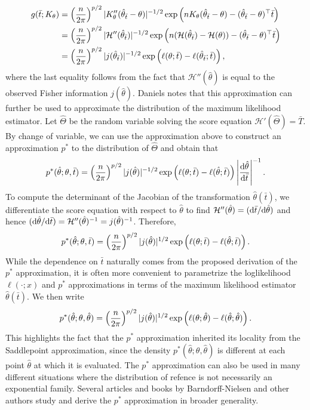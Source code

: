 \begin{align*}
    g(\bar t; K_\theta) 
    &= \left(\frac{n}{2\pi}\right)^{p/2}|K_\theta''(\hat\theta_{\bar t} - \theta)|^{-1/2} \exp\left(nK_\theta(\hat\theta_{\bar t} - \theta) - (\hat\theta_{\bar t} - \theta)^\top \bar t\right)\\
    &= \left(\frac{n}{2\pi}\right)^{p/2}|\mathcal{H}''(\hat\theta_{\bar t})|^{-1/2} \exp\left(n(\mathcal{H}(\hat\theta_{\bar t}) - \mathcal{H}(\theta)) - (\hat\theta_{\bar t} - \theta)^\top \bar t\right)\\
    &= \left(\frac{n}{2\pi}\right)^{p/2}|j(\hat\theta_{\bar t})|^{-1/2} \exp\left(\ell(\theta; \bar t) - \ell(\hat\theta_{\bar t}; \bar t)\right),
\end{align*}
where the last equality follows from the fact that $\mathcal{H}''(\hat\theta)$ is equal to the observed Fisher information $j(\hat\theta)$. Daniels \cite{daniels1958} notes that this approximation can further be used to approximate the distribution of the maximum likelihood estimator. Let $\hat\Theta$ be the random variable solving the score equation $\mathcal{H}'(\hat\Theta) = \bar T$. By change of variable, we can use the approximation above to construct an approximation $p^*$ to the distribution of $\hat\Theta$ and obtain that 
\begin{equation*}
    p^*(\hat\theta; \theta, \bar t) = \left(\frac{n}{2\pi}\right)^{p/2}|j(\hat\theta)|^{-1/2} \exp\left(\ell(\theta; \bar t) - \ell(\hat\theta; \bar t)\right) \left|\frac{\text{d} \hat\theta}{\text{d} \bar t}\right|^{-1}.
\end{equation*}
To compute the determinant of the Jacobian of the transformation $\hat\theta(\bar t)$, we  differentiate the score equation with respect to $\hat\theta$ to find $\mathcal{H}''(\hat\theta) = (\text{d} \bar t / \text{d} \hat\theta)$ and hence $(\text{d} \hat\theta / \text{d} \bar t) = \mathcal{H}''(\hat\theta)^{-1} = j(\hat\theta)^{-1}$. Therefore,
\begin{equation} \label{eq-pstar}
    p^*(\hat\theta; \theta, \bar t) = \left(\frac{n}{2\pi}\right)^{p/2}|j(\hat\theta)|^{1/2} \exp\left(\ell(\theta; \bar t) - \ell(\hat\theta; \bar t)\right).
\end{equation}
While the dependence on $\bar t$ naturally comes from the proposed derivation of the $p^*$ approximation, it is often more convenient to parametrize the loglikelihood $\ell(\cdot; x)$ and $p^*$ approximations in terms of the maximum likelihood estimator $\hat\theta(\bar t)$. We then write
\begin{equation*}
    p^*(\hat\theta; \theta, \hat\theta) = \left(\frac{n}{2\pi}\right)^{p/2}|j(\hat\theta)|^{1/2} \exp\left(\ell(\theta; \hat\theta) - \ell(\hat\theta; \hat\theta)\right).
\end{equation*}
This highlights the fact that the $p^*$ approximation inherited its locality from the Saddlepoint approximation, since the density $p^*(\hat\theta; \theta, \hat\theta)$ is different at each point $\hat\theta$ at which it is evaluated. The $p^*$ approximation can also be used in many different situations where the distribution of refence is not necessarily an exponential family. Several articles and books by Barndorff-Nielsen\cite{BarndorffNielsen1980,BarndorffNielsen1983} and other authors study and derive the $p^*$ approximation in broader generality.

